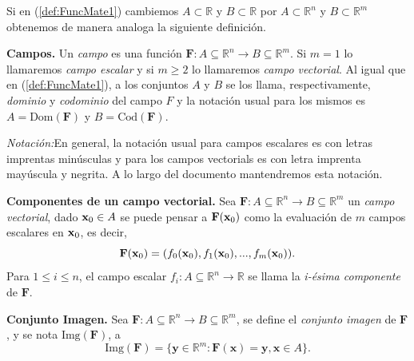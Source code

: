 
\begin{obs}
Si en  (\ref{def:FuncMate1})  cambiemos  $A \subset \mathbb{R}$ y $B \subset \mathbb{R}$ por $A \subset \mathbb{R}^{n}$ y $B \subset \mathbb{R}^{m}$  obtenemos de manera analoga la siguiente definici\'on.    
\end{obs}
\begin{definition} {\textbf{Campos.}}
  Un \textit{campo} es una funci\'on   $\mathbf{F}:A\subseteq \mathbb{R}^n \rightarrow B \subseteq \mathbb{R}^m.$    Si $m=1$ lo llamaremos  \textit{ campo escalar }  y  si  $m\geq 2$ lo llamaremos   \textit{ campo vectorial}. Al igual que en (\ref{def:FuncMate1}), a los conjuntos $A$ y $B$  se los llama, respectivamente, \textit{dominio}  y \textit{codominio} del campo $F$ y  la notaci\'on usual para los mismos  es  $A=\text{Dom}( \mathbf{F})$ y $B=\text{Cod}( \mathbf{F})$.   
  \end{definition}
  
  \textit{Notaci\'on:}En general, la notaci\'on usual  para campos escalares es  con letras imprentas minúsculas y para  los campos vectorials es con letra imprenta mayúscula y negrita. A lo largo del documento mantendremos esta notación. 
  
  \begin{definition} {\textbf{Componentes de un campo vectorial.}}
  Sea   $\mathbf{F}:A\subseteq \mathbb{R}^n \rightarrow B \subseteq \mathbb{R}^m$   un \textit{campo vectorial}, dado $\vect{x}_0 \in A$ se puede pensar a  $\mathbf{F}(\vect{x}_0)$   como la evaluación de $m$ campos escalares en $\vect{x}_0$, 
    es decir,
    \begin{equation*}
        \mathbf{F}(\vect{x}_0)=(f_0(\vect{x}_0), f_1(\vect{x}_0),..., f_m(\vect{x}_0)).
    \end{equation*}
  Para $1 \leq i \leq n$,  el campo escalar $f_i: A\subseteq \mathbb{R}^n \rightarrow  \mathbb{R}$ se llama la \textit{i-\'esima componente} de $\mathbf{F}.$
 \end{definition}
  
  
  \begin{definition}{\textbf{Conjunto Imagen.}}
    Sea  $\mathbf{F}:A\subseteq \mathbb{R}^n \rightarrow B \subseteq \mathbb{R}^m$, se define el \textit{conjunto imagen} de $\mathbf{F}$, y se nota $ \text{Img}(\mathbf{F})$, a 
    \begin{equation*}
        \text{Img}(\mathbf{F})=\{\mathbf{y}\in\mathbb{R}^m: \mathbf{F}(\mathbf{x})=\mathbf{y}, \mathbf{x} \in A\}.
    \end{equation*}
  \end{definition}
  
